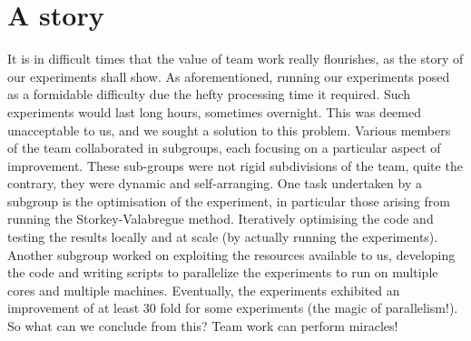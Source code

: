 \section{A story}
It is in difficult times that the value of team work really flourishes, as the story of our experiments shall show. As aforementioned, running our experiments posed as a formidable difficulty due the hefty processing time it required. Such experiments would last long hours, sometimes overnight. This was deemed unacceptable to us, and we sought a solution to this problem. Various members of the team collaborated in subgroups, each focusing on a particular aspect of improvement. These sub-groups were not rigid subdivisions of the team, quite the contrary, they were dynamic and self-arranging. One task undertaken by a subgroup is the optimisation of the experiment, in particular those arising from running the Storkey-Valabregue method. Iteratively optimising the code and testing the results locally and at scale (by actually running the experiments). Another subgroup worked on exploiting the resources available to us, developing the code and writing scripts to parallelize the experiments to run on multiple cores and multiple machines. Eventually, the experiments exhibited an improvement of at least 30 fold for some experiments (the magic of parallelism!). So what can we conclude from this? Team work can perform miracles!
